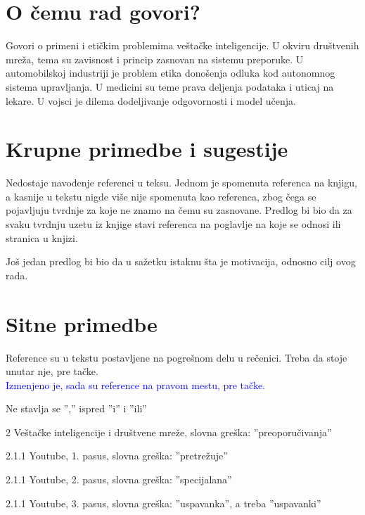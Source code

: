 \documentclass[a4paper]{report}
\newcommand{\odgovor}[1]{\textcolor{blue}{#1}}
\begin{document}
\section{O čemu rad govori?}

Govori o primeni i etičkim problemima veštačke inteligencije. U okviru društvenih mreža, tema su zavisnost i princip zasnovan na sistemu preporuke. U automobilskoj industriji je problem etika donošenja odluka kod autonomnog sistema upravljanja. U medicini su teme prava deljenja podataka i uticaj na lekare. U vojsci je dilema dodeljivanje odgovornosti i model učenja.


\section{Krupne primedbe i sugestije}
Nedostaje navođenje referenci u teksu. Jednom je spomenuta referenca na knjigu, a kasnije u tekstu nigde više nije spomenuta kao referenca, zbog čega se pojavljuju tvrdnje za koje ne znamo na čemu su zasnovane. Predlog bi bio da za svaku tvrdnju uzetu iz knjige stavi referenca na poglavlje na koje se odnosi ili stranica u knjizi.

Još jedan predlog bi bio da u sažetku istaknu šta je motivacija, odnosno cilj ovog rada.


\section{Sitne primedbe}
Reference su u tekstu postavljene na pogrešnom delu u rečenici. Treba da stoje unutar nje, pre tačke. \\
\odgovor{Izmenjeno je, sada su reference na pravom mestu, pre tačke.}

Ne stavlja se '','' ispred ''i'' i ''ili''

2 Veštačke inteligencije i društvene mreže, slovna greška: ''preoporučivanja''

2.1.1 Youtube, 1. pasus, slovna greška: ''pretrežuje''

2.1.1 Youtube, 2. pasus, slovna greška: ''specijalana''

2.1.1 Youtube, 3. pasus, slovna greška: ''uspavanka'', a treba ''uspavanki''
\end{document}
